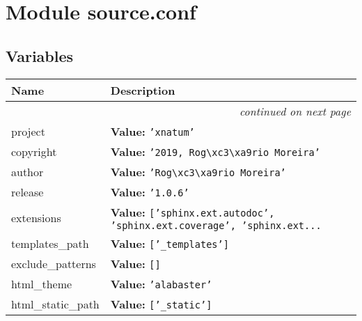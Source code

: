 %
%
%


\section{Module source.conf}

    \label{source:conf}


  \subsection{Variables}

    \vspace{-1cm}
\hspace{\varindent}\begin{longtable}{|p{\varnamewidth}|p{\vardescrwidth}|l}
\cline{1-2}
\cline{1-2} \centering \textbf{Name} & \centering \textbf{Description}& \\
\cline{1-2}
\endhead\cline{1-2}\multicolumn{3}{r}{\small\textit{continued on next page}}\\\endfoot\cline{1-2}
\endlastfoot\raggedright p\-r\-o\-j\-e\-c\-t\- & \raggedright \textbf{Value:} 
{\tt 'xnatum'}&\\
\cline{1-2}
\raggedright c\-o\-p\-y\-r\-i\-g\-h\-t\- & \raggedright \textbf{Value:} 
{\tt '2019, Rog{\textbackslash}xc3{\textbackslash}xa9rio Moreira'}&\\
\cline{1-2}
\raggedright a\-u\-t\-h\-o\-r\- & \raggedright \textbf{Value:} 
{\tt 'Rog{\textbackslash}xc3{\textbackslash}xa9rio Moreira'}&\\
\cline{1-2}
\raggedright r\-e\-l\-e\-a\-s\-e\- & \raggedright \textbf{Value:} 
{\tt '1.0.6'}&\\
\cline{1-2}
\raggedright e\-x\-t\-e\-n\-s\-i\-o\-n\-s\- & \raggedright \textbf{Value:} 
{\tt ['sphinx.ext.autodoc', 'sphinx.ext.coverage', 'sphinx.ext\texttt{...}}&\\
\cline{1-2}
\raggedright t\-e\-m\-p\-l\-a\-t\-e\-s\-\_\-p\-a\-t\-h\- & \raggedright \textbf{Value:} 
{\tt ['\_templates']}&\\
\cline{1-2}
\raggedright e\-x\-c\-l\-u\-d\-e\-\_\-p\-a\-t\-t\-e\-r\-n\-s\- & \raggedright \textbf{Value:} 
{\tt []}&\\
\cline{1-2}
\raggedright h\-t\-m\-l\-\_\-t\-h\-e\-m\-e\- & \raggedright \textbf{Value:} 
{\tt 'alabaster'}&\\
\cline{1-2}
\raggedright h\-t\-m\-l\-\_\-s\-t\-a\-t\-i\-c\-\_\-p\-a\-t\-h\- & \raggedright \textbf{Value:} 
{\tt ['\_static']}&\\
\cline{1-2}
\end{longtable}

